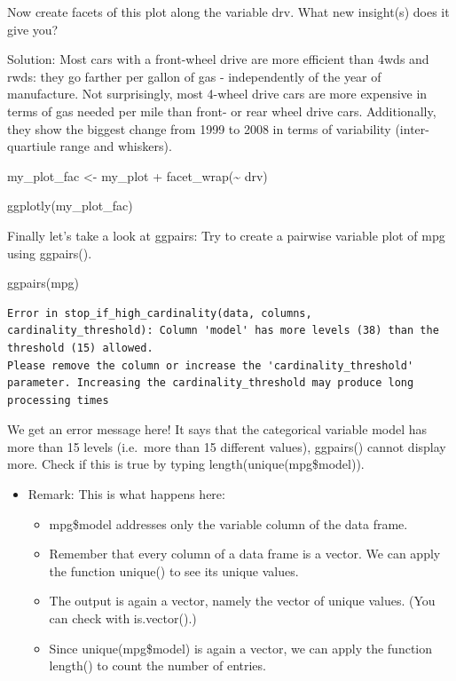 \documentclass[
  letterpaper,
  DIV=11,
  numbers=noendperiod]{scrartcl}
\newenvironment{Shaded}{\begin{snugshade}}{\end{snugshade}}
\newcommand{\FunctionTok}[1]{\textcolor[rgb]{0.28,0.35,0.67}{#1}}
\newcommand{\NormalTok}[1]{\textcolor[rgb]{0.00,0.23,0.31}{#1}}
\newcommand{\OtherTok}[1]{\textcolor[rgb]{0.00,0.23,0.31}{#1}}
\newcommand{\SpecialCharTok}[1]{\textcolor[rgb]{0.37,0.37,0.37}{#1}}
\begin{document}
Now create facets of this plot along the variable drv. What new
insight(s) does it give you?

Solution: Most cars with a front-wheel drive are more efficient than
4wds and rwds: they go farther per gallon of gas - independently of the
year of manufacture. Not surprisingly, most 4-wheel drive cars are more
expensive in terms of gas needed per mile than front- or rear wheel
drive cars. Additionally, they show the biggest change from 1999 to 2008
in terms of variability (inter-quartiule range and whiskers).

\begin{Shaded}
\begin{Highlighting}[]
\NormalTok{my\_plot\_fac }\OtherTok{\textless{}{-}}\NormalTok{ my\_plot }\SpecialCharTok{+} \FunctionTok{facet\_wrap}\NormalTok{(}\SpecialCharTok{\textasciitilde{}}\NormalTok{ drv)}

\FunctionTok{ggplotly}\NormalTok{(my\_plot\_fac)}
\end{Highlighting}
\end{Shaded}

Finally let's take a look at ggpairs: Try to create a pairwise variable
plot of mpg using ggpairs().

\begin{Shaded}
\begin{Highlighting}[]
\FunctionTok{ggpairs}\NormalTok{(mpg)}
\end{Highlighting}
\end{Shaded}

\begin{verbatim}
Error in stop_if_high_cardinality(data, columns, cardinality_threshold): Column 'model' has more levels (38) than the threshold (15) allowed.
Please remove the column or increase the 'cardinality_threshold' parameter. Increasing the cardinality_threshold may produce long processing times
\end{verbatim}

We get an error message here! It says that the categorical variable
model has more than 15 levels (i.e.~more than 15 different values),
ggpairs() cannot display more. Check if this is true by typing
length(unique(mpg\$model)).

\begin{itemize}
\item
  Remark: This is what happens here:

  \begin{itemize}
  \item
    mpg\$model addresses only the variable column of the data frame.
  \item
    Remember that every column of a data frame is a vector. We can apply
    the function unique() to see its unique values.
  \item
    The output is again a vector, namely the vector of unique values.
    (You can check with is.vector().)
  \item
    Since unique(mpg\$model) is again a vector, we can apply the
    function length() to count the number of entries.
  \end{itemize}
\end{itemize}
\end{document}
